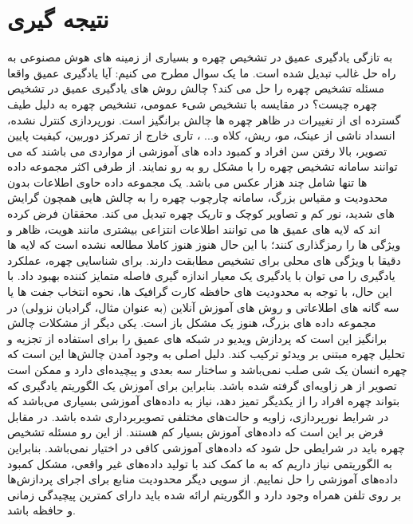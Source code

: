 \section{نتیجه گیری}
به تازگی یادگیری عمیق در تشخیص چهره و بسیاری از زمینه های هوش مصنوعی به راه حل غالب تبدیل شده است. ما یک سوال مطرح می کنیم: آیا یادگیری عمیق واقعا مسئله تشخیص چهره را حل می کند؟ چالش روش های یادگیری عمیق در تشخیص چهره چیست؟ 
\noindent
در مقایسه با تشخیص شیء عمومی، تشخیص چهره به دلیل طیف گسترده ای از تغییرات در ظاهر چهره ها چالش برانگیز است. نورپردازی کنترل نشده، انسداد ناشی از عینک، مو، ریش، کلاه و... ، تاری خارج از تمرکز دوربین، کیفیت پایین تصویر، بالا رفتن سن افراد و کمبود داده های آموزشی از مواردی می باشند که می توانند سامانه تشخیص چهره را با مشکل رو به رو نمایند.
\noindent
از طرفی اکثر مجموعه داده ها تنها شامل چند هزار عکس می باشد. یک مجموعه داده حاوی اطلاعات بدون محدودیت و مقیاس بزرگ، سامانه چارچوب چهره را به چالش هایی همچون گرایش های شدید، نور کم و تصاویر کوچک و تاریک چهره تبدیل می کند. محققان فرض کرده اند که لایه های عمیق  ها می توانند اطلاعات انتزاعی بیشتری مانند هویت، ظاهر و ویژگی ها را رمزگذاری کنند؛ با این حال هنوز هنوز کاملا مطالعه نشده است که لایه ها دقیقا با ویژگی های محلی برای تشخیص مطابقت دارند.
\noindent
برای شناسایی چهره، عملکرد یادگیری را می توان با یادگیری یک معیار اندازه گیری فاصله متمایز کننده بهبود داد. با این حال، با توجه به محدودیت های حافظه کارت گرافیک ها، نحوه انتخاب جفت ها یا سه گانه های اطلاعاتی و روش های آموزش آنلاین (به عنوان مثال، گرادیان نزولی) در مجموعه داده های بزرگ، هنوز یک مشکل باز است. یکی دیگر از مشکلات چالش برانگیز این است که پردازش ویدیو در شبکه های عمیق را برای استفاده از تجزیه و تحلیل چهره مبتنی بر ویدئو ترکیب کند.
\noindent
دلیل اصلی به وجود آمدن چالش‌ها این است که چهره انسان یک شی صلب نمی‌باشد و ساختار سه بعدی و پیچیده‌ای دارد و ممکن است تصویر از هر زاویه‌ای گرفته شده باشد. بنابراین برای آموزش یک الگوریتم یادگیری که بتواند چهره افراد را از یکدیگر تمیز دهد، نیاز به داده‌های آموزشی بسیاری می‌باشد که در شرایط نورپردازی، زاویه و حالت‌های مختلفی تصویربرداری شده باشد. در مقابل فرض بر این است که داده‌های آموزش بسیار کم هستند. از این رو مسئله تشخیص چهره باید در شرایطی حل شود که داده‌های آموزشی کافی در اختیار نمی‌باشد. بنابراین به الگوریتمی نیاز داریم که به ما کمک کند با تولید داده‌های غیر واقعی، مشکل کمبود داده‌های آموزشی را حل نماییم. از سویی دیگر محدودیت‌ منابع برای اجرای پردازش‌ها بر روی تلفن همراه وجود دارد و الگوریتم ارائه شده باید دارای کمترین پیچیدگی زمانی و حافظه باشد.
\noindent
